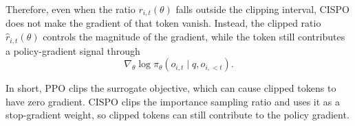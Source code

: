 Therefore, even when the ratio $r_{i,t}(\theta)$ falls outside the clipping interval, CISPO does not make the gradient of that token vanish. Instead, the clipped ratio $\hat r_{i,t}(\theta)$
controls the magnitude of the gradient, while the token still contributes a policy-gradient signal through
\[
    \nabla_\theta \log \pi_\theta(o_{i,t}\mid q,o_{i,<t}).
\]

In short, PPO clips the surrogate objective, which can cause clipped tokens to have zero gradient. CISPO clips the importance sampling ratio and uses it as a stop-gradient weight, so clipped tokens can still contribute to the policy gradient.
